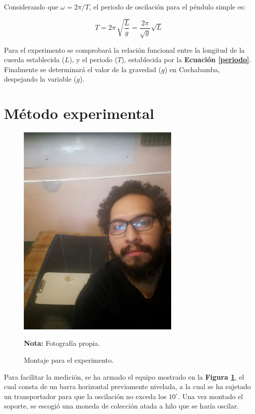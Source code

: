 \documentclass[letter,11pt]{article}
\newcommand{\source}[1]{\vspace{-11pt} \caption*{\small{\textbf{Nota:} {#1}}}}
\begin{document}
Considerando que $\omega = 2\pi / T$, el periodo de oscilación para el péndulo
simple es:

\begin{equation}
    T = 2\pi\, \sqrt{\frac{L}{g}} = \frac{2\pi}{\sqrt{g}} \sqrt{L}
\label{periodo}
\end{equation}
\vspace{0.10cm}

Para el experimento se comprobará la relación funcional entre la longitud de la
cuerda establecida ($L$), y el periodo ($T$), establecida por la
\textbf{Ecuación \ref{periodo}}. Finalmente se determinará el valor de la
gravedad ($g$) en Cochabamba, despejando la variable ($g$).

\section{Método experimental}

\begin{figure}
\centering
\includegraphics[width=0.70\textwidth]{resources/f2.eps}
\caption{Montaje para el experimento.}
\label{figura2}
\source{Fotografía propia.}
\end{figure}

Para facilitar la medición, se ha armado el equipo mostrado en la
\textbf{Figura \ref{figura2}}, el cual consta de un barra horizontal
previamente nivelada, a la cual se ha sujetado un transportador para que la
oscilación no exceda los $10^\circ$. Una vez montado el soporte, se escogió una
moneda de colección atada a hilo que se haría oscilar.
\end{document}
